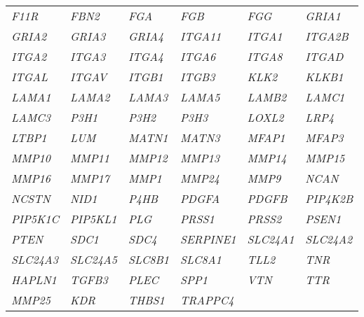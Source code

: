 {\begin{longtable}{>{\em}l>{\em}l>{\em}l>{\em}l>{\em}l>{\em}l}
  \rowcolor{black!10}
  F11R & FBN2 & FGA & FGB & FGG & GRIA1 \\
  \rowcolor{black!5}
  GRIA2 & GRIA3 & GRIA4 & ITGA11 & ITGA1 & ITGA2B \\
  \rowcolor{black!10}
  ITGA2 & ITGA3 & ITGA4 & ITGA6 & ITGA8 & ITGAD \\
  \rowcolor{black!5}
  ITGAL & ITGAV & ITGB1 & ITGB3 & KLK2 & KLKB1 \\
  \rowcolor{black!10}
  LAMA1 & LAMA2 & LAMA3 & LAMA5 & LAMB2 & LAMC1 \\ 
  \rowcolor{black!5}
  LAMC3 & P3H1 & P3H2 & P3H3 & LOXL2 & LRP4 \\ 
  \rowcolor{black!10}
  LTBP1 & LUM & MATN1 & MATN3 & MFAP1 & MFAP3 \\ 
  \rowcolor{black!5}
  MMP10 & MMP11 & MMP12 & MMP13 & MMP14 & MMP15 \\ 
  \rowcolor{black!10}
  MMP16 & MMP17 & MMP1 & MMP24 & MMP9 & NCAN \\ 
  \rowcolor{black!5}
  NCSTN & NID1 & P4HB & PDGFA & PDGFB & PIP4K2B \\ 
  \rowcolor{black!10}
  PIP5K1C & PIP5KL1 & PLG & PRSS1 & PRSS2 & PSEN1 \\ 
  \rowcolor{black!5}
  PTEN & SDC1 & SDC4 & SERPINE1 & SLC24A1 & SLC24A2 \\ 
  \rowcolor{black!10}
  SLC24A3 & SLC24A5 & SLC8B1 & SLC8A1 & TLL2 & TNR \\ 
  \rowcolor{black!5}
  HAPLN1 & TGFB3 & PLEC & SPP1 & VTN & TTR \\ 
  \rowcolor{black!10}
  MMP25 & KDR & THBS1 & TRAPPC4 &  &  \\ 
   \hline
\end{longtable}
} %


\FloatBarrier

\clearpage

